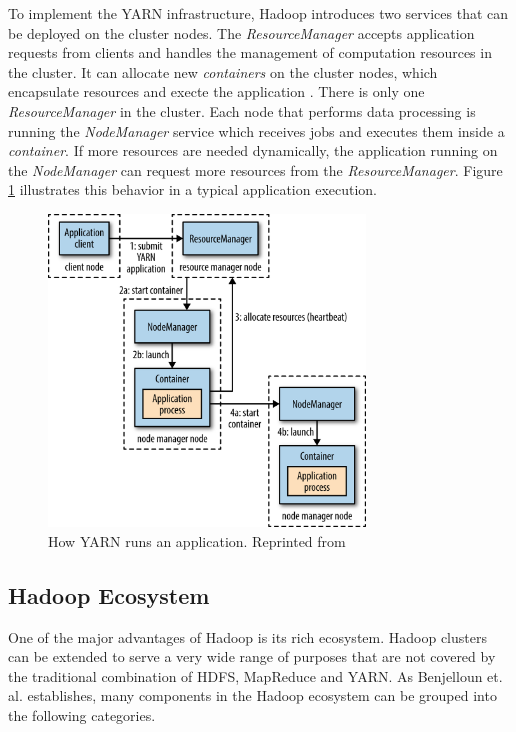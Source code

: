 To implement the \ac{YARN} infrastructure, Hadoop introduces two services that can be deployed on the cluster nodes.
The \emph{ResourceManager} accepts application requests from clients and handles the management of computation resources in the cluster.
It can allocate new \emph{containers} on the cluster nodes, which encapsulate resources and execte the application .
There is only one \emph{ResourceManager} in the cluster.
Each node that performs data processing is running the \emph{NodeManager} service which receives jobs and executes them inside a \emph{container}.
If more resources are needed dynamically, the application running on the \emph{NodeManager} can request more resources from the \emph{ResourceManager}.
Figure \ref{fig:yarn} illustrates this behavior in a typical application execution.

\begin{figure}[th]
     {\centering\includegraphics[width=0.75\textwidth]{img/hddg_0402.png}\par}
	\caption{\label{fig:yarn}How YARN runs an application. Reprinted from \autocite[][Chap.~4]{white2015hadoop}}
\end{figure}


\subsection{Hadoop Ecosystem}
\label{hadoop-ecosystem}

One of the major advantages of Hadoop is its rich ecosystem. 
Hadoop clusters can be extended to serve a very wide range of purposes 
that are not covered by the traditional combination of \ac{HDFS}, MapReduce and \ac{YARN}.
As Benjelloun et. al. establishes, many components in the Hadoop ecosystem 
can be grouped into the following categories.\autocite{7105553}

